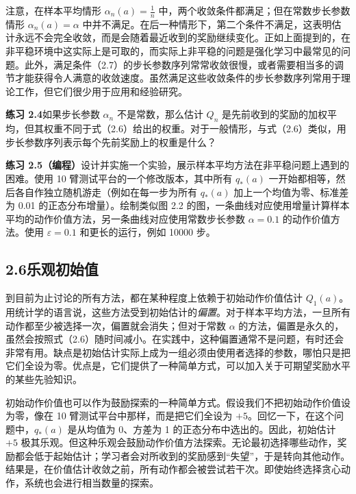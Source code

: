 \documentclass[UTF8, 12pt, fontset=fandol, oneside]{ctexart}
\begin{document}
注意，在样本平均情形 $\alpha_n(a)=\frac{1}{n}$ 中，两个收敛条件都满足；但在常数步长参数情形 $\alpha_n(a)=\alpha$ 中并不满足。在后一种情形下，第二个条件不满足，这表明估计永远不会完全收敛，而是会随着最近收到的奖励继续变化。正如上面提到的，在非平稳环境中这实际上是可取的，而实际上非平稳的问题是强化学习中最常见的问题。此外，满足条件（2.7）的步长参数序列常常收敛很慢，或者需要相当多的调节才能获得令人满意的收敛速度。虽然满足这些收敛条件的步长参数序列常用于理论工作，但它们很少用于应用和经验研究。

\noindent\textbf{练习 2.4}\quad 如果步长参数 $\alpha_n$ 不是常数，那么估计 $Q_n$ 是先前收到的奖励的加权平均，但其权重不同于式（2.6）给出的权重。对于一般情形，与式（2.6）类似，用步长参数序列表示每个先前奖励上的权重是什么？

\noindent\textbf{练习 2.5（编程）}\quad 设计并实施一个实验，展示样本平均方法在非平稳问题上遇到的困难。使用 10 臂测试平台的一个修改版本，其中所有 $q_*(a)$ 一开始都相等，然后各自作独立随机游走（例如在每一步为所有 $q_*(a)$ 加上一个均值为零、标准差为 0.01 的正态分布增量）。绘制类似图 2.2 的图，一条曲线对应使用增量计算样本平均的动作价值方法，另一条曲线对应使用常数步长参数 $\alpha=0.1$ 的动作价值方法。使用 $\varepsilon=0.1$ 和更长的运行，例如 10000 步。

\subsection*{2.6\quad 乐观初始值}

到目前为止讨论的所有方法，都在某种程度上依赖于初始动作价值估计 $Q_1(a)$。用统计学的语言说，这些方法受到初始估计的\emph{偏置}。对于样本平均方法，一旦所有动作都至少被选择一次，偏置就会消失；但对于常数 $\alpha$ 的方法，偏置是永久的，虽然会按照式（2.6）随时间减小。在实践中，这种偏置通常不是问题，有时还会非常有用。缺点是初始估计实际上成为一组必须由使用者选择的参数，哪怕只是把它们全设为零。优点是，它们提供了一种简单方式，可以加入关于可期望奖励水平的某些先验知识。

初始动作价值也可以作为鼓励探索的一种简单方式。假设我们不把初始动作价值设为零，像在 10 臂测试平台中那样，而是把它们全设为 $+5$。回忆一下，在这个问题中，$q_*(a)$ 是从均值为 0、方差为 1 的正态分布中选出的。因此，初始估计 $+5$ 极其乐观。但这种乐观会鼓励动作价值方法探索。无论最初选择哪些动作，奖励都会低于起始估计；学习者会对所收到的奖励感到“失望”，于是转向其他动作。结果是，在价值估计收敛之前，所有动作都会被尝试若干次。即使始终选择贪心动作，系统也会进行相当数量的探索。
\end{document}
